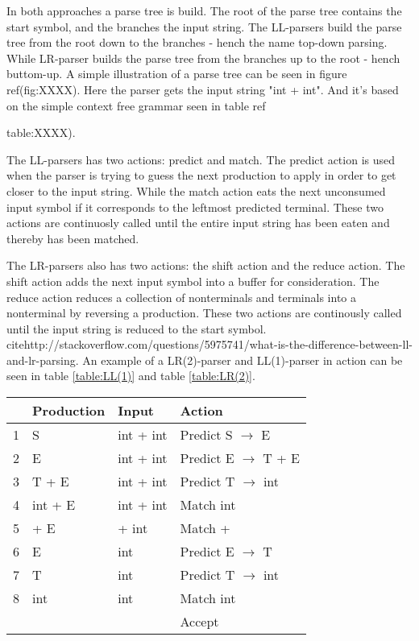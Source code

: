In both approaches a parse tree is build. The root of the parse tree contains the start symbol, and the branches the input string. The LL-parsers
build the parse tree from the root down to the branches - hench the name top-down parsing. While LR-parser builds the parse tree from the branches up to the root - hench buttom-up. A simple illustration of a parse tree can be seen in figure ref(fig:XXXX). Here the parser gets the input string "int + int". 
And it's based on the simple context free grammar seen in table ref{table:XXXX).

The LL-parsers has two actions: predict and match. The predict action is used when the parser 
is trying to guess the next production to apply in order to get closer to the input string. 
While the match action eats the next unconsumed input symbol if it corresponds to the leftmost 
predicted terminal. These two actions are continuosly called until the entire input string has 
been eaten and thereby has been matched.

The LR-parsers also has two actions: the shift action and the reduce action. The shift action
adds the next input symbol into a buffer for consideration. The reduce action reduces a collection
of nonterminals and terminals into a nonterminal by reversing a production. These two actions are
continously called until the input string is reduced to the start symbol. 
cite{http://stackoverflow.com/questions/5975741/what-is-the-difference-between-ll-and-lr-parsing}.
An example of a LR(2)-parser and LL(1)-parser in action can be seen in table \ref{table:LL(1)} and 
table \ref{table:LR(2)}.  

\begin{center}
    \begin{tabular}{| l | l | l | l |}                             \hline
      & Production & Input      & Action                        \\ \hline
    1 & S          & int + int  & Predict S $\rightarrow$ E     \\ 
    2 & E          & int + int  & Predict E $\rightarrow$ T + E \\ 
    3 & T + E      & int + int  & Predict T $\rightarrow$ int   \\
    4 & int + E    & int + int  & Match int                     \\ 
    5 & + E        & + int      & Match +                       \\ 
    6 & E          & int        & Predict E $\rightarrow$ T     \\ 
    7 & T          & int        & Predict T $\rightarrow$ int   \\
    8 & int        & int        & Match int                     \\ 
      &            &            & Accept                        \\ \hline
    \end{tabular}
    \label{table:LL(1)}
\end{center}

}
